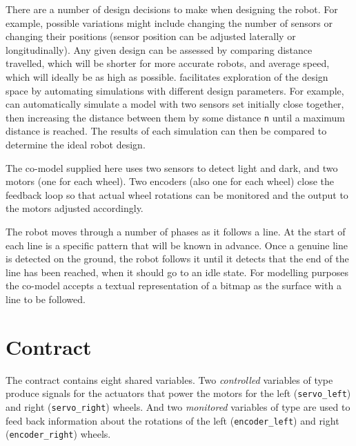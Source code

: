 There are a number of design decisions to make when designing the
robot.  For example, possible variations might include changing the
number of sensors or changing their positions (sensor position can be
adjusted laterally or longitudinally). Any given design can be
assessed by comparing distance travelled, which will be shorter for
more accurate robots, and average speed, which will ideally be as high
as possible.  \DESTECS facilitates exploration of the design space by
automating simulations with different design parameters. For example,
\DESTECS can automatically simulate a model with two sensors set
initially close together, then increasing the distance between them by
some distance \texttt{n} until a maximum distance is reached.  The
results of each simulation can then be compared to determine the ideal
robot design.

The co-model supplied here uses two sensors to detect light and dark,
and two motors (one for each wheel).  Two encoders (also one for each
wheel) close the feedback loop so that actual wheel rotations can be
monitored and the output to the motors adjusted accordingly.

The robot moves through a number of phases as it follows a line.  At
the start of each line is a specific pattern that will be known in
advance.  Once a genuine line is detected on the ground, the robot
follows it until it detects that the end of the line has been reached,
when it should go to an idle state.  For modelling purposes the
co-model accepts a textual representation of a bitmap as the surface with a line to be followed.



%
%
%
%

\section{Contract}
The contract contains eight shared variables.  Two \emph{controlled}
variables of type  produce signals for the actuators that
power the motors for the left (\texttt{servo\_left}) and right
(\texttt{servo\_right}) wheels.  And two \emph{monitored}
variables of type  are used to feed back information about
the rotations of the left (\texttt{encoder\_left}) and right
(\texttt{encoder\_right}) wheels.

